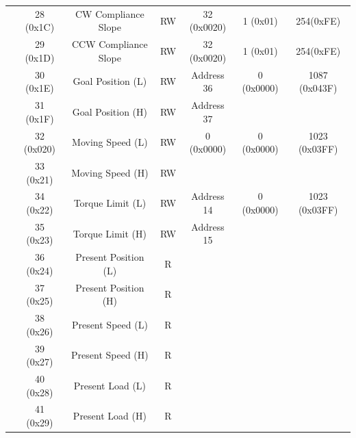 \begin{table}[htbp]
\begin{adjustwidth}{-1.9cm}{-1.5cm}
\begin{tabular}{|c|c|c|c|c|c|c|}
		\multicolumn{ 1}{|c|}{} & 28 (0x1C) & CW Compliance Slope & RW & 32 (0x0020) & 1 (0x01) & 254(0xFE) \\ \cline{ 2- 7}
		\multicolumn{ 1}{|c|}{} & 29 (0x1D) & CCW Compliance Slope & RW & 32 (0x0020) & 1 (0x01) & 254(0xFE) \\ \cline{ 2- 7}
		\multicolumn{ 1}{|c|}{} & 30 (0x1E) & Goal Position (L) & RW & Address 36 & \multicolumn{ 1}{c|}{ 0 (0x0000) } & \multicolumn{ 1}{c|}{1087 (0x043F)} \\ \cline{ 2- 5}
		\multicolumn{ 1}{|c|}{} & 31 (0x1F) & Goal Position (H) & RW & Address 37 & \multicolumn{ 1}{c|}{} & \multicolumn{ 1}{c|}{} \\ \cline{ 2- 7}
		\multicolumn{ 1}{|c|}{} & 32 (0x020) & Moving Speed (L) & RW & \multicolumn{ 1}{c|}{ 0 (0x0000) } & \multicolumn{ 1}{c|}{ 0 (0x0000) } & \multicolumn{ 1}{c|}{1023 (0x03FF)} \\ \cline{ 2- 4}
		\multicolumn{ 1}{|c|}{} & 33 (0x21) & Moving Speed (H) & RW & \multicolumn{ 1}{c|}{} & \multicolumn{ 1}{c|}{} & \multicolumn{ 1}{c|}{} \\ \cline{ 2- 7}
		\multicolumn{ 1}{|c|}{} & 34 (0x22) & Torque Limit (L) & RW & Address 14 & \multicolumn{ 1}{c|}{ 0 (0x0000) } & \multicolumn{ 1}{c|}{1023 (0x03FF)} \\ \cline{ 2- 5}
		\multicolumn{ 1}{|c|}{} & 35 (0x23) & Torque Limit (H) & RW & Address 15 & \multicolumn{ 1}{c|}{} & \multicolumn{ 1}{c|}{} \\ \cline{ 2- 7}
		\multicolumn{ 1}{|c|}{} & 36 (0x24) & Present Position (L) & R & \multicolumn{ 1}{c|}{} & \multicolumn{ 1}{c|}{} & \multicolumn{ 1}{c|}{} \\ \cline{ 2- 4}
		\multicolumn{ 1}{|c|}{} & 37 (0x25) & Present Position (H) & R & \multicolumn{ 1}{c|}{} & \multicolumn{ 1}{c|}{} & \multicolumn{ 1}{c|}{} \\ \cline{ 2- 7}
		\multicolumn{ 1}{|c|}{} & 38 (0x26) & Present Speed (L) & R & \multicolumn{ 1}{c|}{} & \multicolumn{ 1}{c|}{} & \multicolumn{ 1}{c|}{} \\ \cline{ 2- 4}
		\multicolumn{ 1}{|c|}{} & 39 (0x27) & Present Speed (H) & R & \multicolumn{ 1}{c|}{} & \multicolumn{ 1}{c|}{} & \multicolumn{ 1}{c|}{} \\ \cline{ 2- 7}
		\multicolumn{ 1}{|c|}{} & 40 (0x28) & Present Load (L) & R & \multicolumn{ 1}{c|}{} & \multicolumn{ 1}{c|}{} & \multicolumn{ 1}{c|}{} \\ \cline{ 2- 4}
		\multicolumn{ 1}{|c|}{} & 41 (0x29) & Present Load (H) & R & \multicolumn{ 1}{c|}{} & \multicolumn{ 1}{c|}{} & \multicolumn{ 1}{c|}{} \\ \cline{ 2- 7}

\end{tabular}
\end{adjustwidth}
\end{table}
